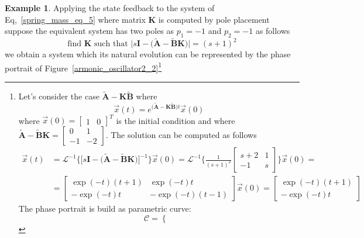 \documentclass[11pt,a4paper,oneside]{book}
\numberwithin{equation}{section}
\theoremstyle{it}
\theoremstyle{definition}
\newtheorem{example}{Example}[chapter]
\begin{document}
\begin{example}
	Applying the state feedback to the system of Eq,~\eqref{spring_mass_eq_5} where matrix $\mathbf{K}$ is 
	computed by pole placement suppose the equivalent system has two poles as 
	$p_1=-1$ and $p_2=-1$ as follows
	\begin{equation}
		\text{find }\mathbf{K} \text{ such that 
		}\Big|s\mathbf{I}-\big(\tilde{\mathbf{A}}-\tilde{\mathbf{B}}\mathbf{K}\big)\Big|=(s+1)^2
	\end{equation}
	we obtain a system which its natural evolution can be 
	represented by the phase portrait of Figure~\ref{armonic_oscillator2_2}\footnote{Let's consider the case $\tilde{\mathbf{A}}-\mathbf{K}\tilde{\mathbf{B}}$ where
		\begin{equation}
			\vec{x}(t) = e^{\big(\tilde{\mathbf{A}}-\mathbf{K}\tilde{\mathbf{B}}\big)t}\vec{x}(0)
		\end{equation}
		where $\vec{x}(0)=\begin{bmatrix}
			1&0
		\end{bmatrix}^T$ is the initial condition and where $\tilde{\mathbf{A}}-\tilde{\mathbf{B}}\mathbf{K} = \begin{bmatrix}
			0 & 1 \\ -1 & -2
		\end{bmatrix}$. The solution can be computed as follows
		\begin{equation}
			\begin{aligned}
				\vec{x}(t) &= 
				\mathcal{L}^{-1}\Big\{\Big[s\mathbf{I}-\big(\tilde{\mathbf{A}}-\tilde{\mathbf{B}}\mathbf{K}\big)\Big]^{-1}\Big\}\vec{x}(0)
				= \mathcal{L}^{-1}\Bigg\{\frac{1}{(s+1)^2}\begin{bmatrix} s+2 & 1 \\[6pt] -1 & s 
				\end{bmatrix}\Bigg\}\vec{x}(0) = \\[6pt]
				&= \begin{bmatrix} \exp(-t)(t+1) & \exp(-t)t \\[6pt] -\exp(-t)t & -\exp(-t)(t-1) \end{bmatrix}\vec{x}(0) = \begin{bmatrix} \exp(-t)(t+1) \\[6pt] -\exp(-t)t \end{bmatrix}
			\end{aligned}
		\end{equation}
		The phase portrait is build as parametric curve:
		\begin{equation}
			\mathcal{C}=\left\lbrace \begin{aligned}

\end{aligned}
\end{equation}}
\end{example}
\end{document}
